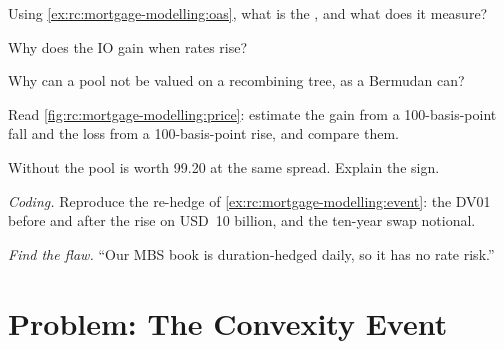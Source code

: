 \begin{exercise}[$\star$]\label{exo:rc:mortgage-modelling:2}
Using \cref{ex:rc:mortgage-modelling:oas}, what is the , and what does it
measure?
\end{exercise}

\begin{exercise}[$\star$]\label{exo:rc:mortgage-modelling:3}
Why does the IO gain when rates rise?
\end{exercise}

\begin{exercise}[$\star\star$]\label{exo:rc:mortgage-modelling:4}
Why can a pool not be valued on a recombining tree, as a Bermudan can?
\end{exercise}

\begin{exercise}[$\star\star$]\label{exo:rc:mortgage-modelling:5}
Read \cref{fig:rc:mortgage-modelling:price}: estimate the gain from a 100-basis-point
fall and the loss from a 100-basis-point rise, and compare them.
\end{exercise}

\begin{exercise}[$\star\star$]\label{exo:rc:mortgage-modelling:6}
Without  the pool is worth 99.20 at the same spread. Explain the sign.
\end{exercise}

\begin{exercise}[$\star\star\star$]\label{exo:rc:mortgage-modelling:7}
\emph{Coding.} Reproduce the re-hedge of \cref{ex:rc:mortgage-modelling:event}: the DV01
before and after the rise on USD~10 billion, and the ten-year swap notional.
\end{exercise}

\begin{exercise}[$\star\star\star$]\label{exo:rc:mortgage-modelling:8}
\emph{Find the flaw.} ``Our MBS book is duration-hedged daily, so it has no rate risk.''
\end{exercise}

\section{Problem: The Convexity Event}

